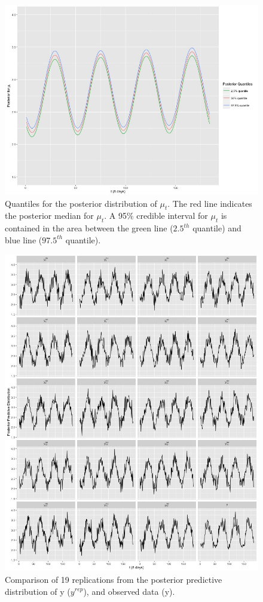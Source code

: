 \documentclass[12pt, a4paper]{article}
\begin{document}
\begin{figure}[H]
\centering
\includegraphics[width=0.85\linewidth]{projectfig2.jpeg}
\caption{\small Quantiles for the posterior distribution of $\mu_{t}$. The red line indicates the posterior median for $\mu_{t}$. A 95$\%$ credible interval for $\mu_{t}$ is contained in the area between the green line ($2.5^{th}$ quantile) and blue line ($97.5^{th}$ quantile).}
\end{figure}

\begin{figure}[H]
\centering
\includegraphics[width=1\linewidth]{projectfig3.jpeg}
\caption{\small Comparison of 19 replications from the posterior predictive distribution of y ($y^{rep}$), and observed data (y).}
\end{figure}
\end{document}
